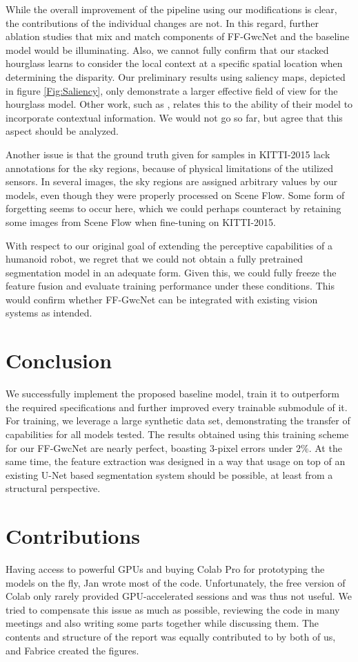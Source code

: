 \documentclass[runningheads]{llncs}
\begin{document}
While the overall improvement of the pipeline using our modifications is clear, the contributions of the individual changes are not. In this regard, further ablation studies that mix and match components of FF-GwcNet and the baseline model would be illuminating. Also, we cannot fully confirm that our stacked hourglass learns to consider the local context at a specific spatial location when determining the disparity. Our preliminary results using saliency maps, depicted in figure \ref{Fig:Saliency}, only demonstrate a larger effective field of view for the hourglass model. Other work, such as \cite{Cost_Volume}, relates this to the ability of their model to incorporate contextual information. We would not go so far, but agree that this aspect should be analyzed. 

Another issue is that the ground truth given for samples in KITTI-2015 lack annotations for the sky regions, because of physical limitations of the utilized sensors. In several images, the sky regions are assigned arbitrary values by our models, even though they were properly processed on Scene Flow. Some form of forgetting seems to occur here, which we could perhaps counteract by retaining some images from Scene Flow when fine-tuning on KITTI-2015.

With respect to our original goal of extending the perceptive capabilities of a humanoid robot, we regret that we could not obtain a fully pretrained segmentation model in an adequate form. Given this, we could fully freeze the feature fusion and evaluate training performance under these conditions. This would confirm whether FF-GwcNet can be integrated with existing vision systems as intended.

\section{Conclusion}
We successfully implement the proposed baseline model, train it to outperform the required specifications and further improved every trainable submodule of it. For training, we leverage a large synthetic data set, demonstrating the transfer of capabilities for all models tested. The results obtained using this training scheme for our FF-GwcNet are nearly perfect, boasting 3-pixel errors under $2 \%$. At the same time, the feature extraction was designed in a way that usage on top of an existing U-Net based segmentation system should be possible, at least from a structural perspective.

\section{Contributions}
Having access to powerful GPUs and buying Colab Pro for prototyping the models on the fly, Jan wrote most of the code. Unfortunately, the free version of Colab only rarely provided GPU-accelerated sessions and was thus not useful. We tried to compensate this issue as much as possible, reviewing the code in many meetings and also writing some parts together while discussing them. The contents and structure of the report was equally contributed to by both of us, and Fabrice created the figures.
\end{document}

